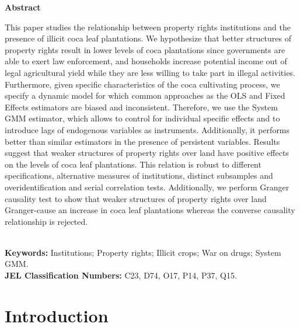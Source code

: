 \documentclass[12pt,a4paper,english]{article}%
\renewcommand{\thefootnote}{\fnsymbol{footnote}}
\begin{document}
\textbf{Abstract} %
\begin{footnotesize}
This paper studies the relationship between property rights institutions and the presence of illicit coca leaf plantations. We hypothesize that better structures of property rights result in lower levels of coca plantations since governments are able to exert law enforcement, and households increase potential income out of legal agricultural yield while they are less willing to take part in illegal activities. Furthermore, given specific characteristics of the coca cultivating process, we specify a dynamic model for which common approaches as the OLS and Fixed Effects estimators are biased and inconsistent. Therefore, we use the System GMM estimator, which allows to control for individual specific effects and to introduce lags of endogenous variables as instruments. Additionally, it performs better than similar estimators in the presence of persistent variables. Results suggest that weaker structures of property rights over land have positive effects on the levels of coca leaf plantations. This relation is robust to different specifications, alternative measures of institutions, distinct subsamples and overidentification and serial correlation tests. Additionally, we perform Granger causality test to show that weaker structures of property rights over land Granger-cause an increase in coca leaf plantations whereas the converse causality relationship is rejected.
\end{footnotesize}
\\[0.5cm]
\textbf{Keywords:} Institutions; Property rights; Illicit crops; War on drugs; System GMM. \\
\textbf{JEL Classification Numbers:} C23, D74, O17, P14, P37, Q15.

\pagebreak%

\onehalfspacing
\renewcommand{\thefootnote}{\arabic{footnote}}
\addtocounter{footnote}{-3}


\section{Introduction}
\label{intro}

\end{document}
